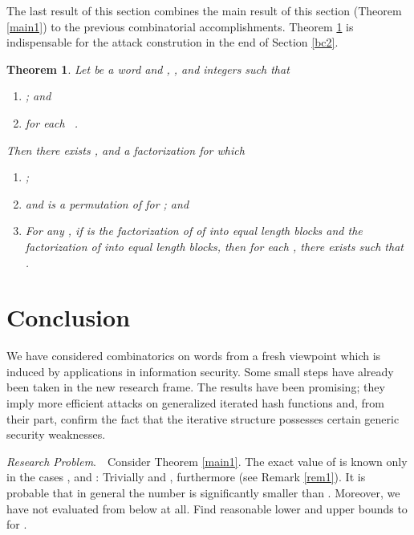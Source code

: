 \documentclass[submission,copyright,creativecommons]{eptcs}
\newtheorem{theorem}{Theorem}
\begin{document}
The last result of this section combines the main result of this section (Theorem \ref{main1}) to the previous combinatorial accomplishments. Theorem \ref{main2} is indispensable for the attack constrution in the end of Section \ref{bc2}.

\begin{theorem}\label{main2}
Let  be a word and  , , and  integers such that 
\begin{enumerate}
\item[] ; and 
\item[\rm{(2)}]  for each \ .
\end{enumerate}
Then there
exists ,  and a
factorization  for which
\begin{enumerate}
\item[\rm{(3)}] ; 
\item[\rm{(4)}]  and  is a permutation of  for
  ; and
\item[\rm{(5)}] For any , if
   is the factorization of
  of  into  equal length 
  blocks and  the
  factorization of  into  equal length
   blocks, then for each ,
  there exists   such that
  .
\end{enumerate}
\end{theorem}

\section{Conclusion}

We have considered combinatorics on words from a fresh viewpoint which is induced by applications in information security. Some small steps have already been taken in the new research frame. The results have been promising; they imply more efficient attacks on generalized iterated hash functions and, from their part, confirm the fact that the iterative structure possesses certain generic security weaknesses. 

\medskip

\noindent \textit{Research Problem}.\ \ Consider Theorem \ref{main1}. The exact value of  is known only in the cases ,  and : Trivially  and , furthermore  (see Remark \ref{rem1}). It is probable that in general the number  is significantly smaller than . Moreover, we have not evaluated  from below at all. Find reasonable lower and upper bounds to  for .  



\end{document}
